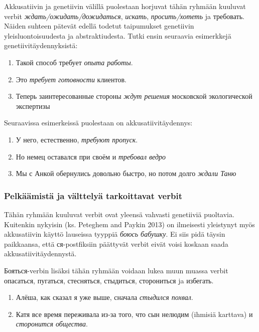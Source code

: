 \documentclass[]{scrartcl}
\providecommand{\tightlist}{%
  \setlength{\itemsep}{0pt}\setlength{\parskip}{0pt}}
\begin{document}
Akkusatiivin ja genetiivin välillä puolestaan horjuvat tähän ryhmään
kuuluvat verbit \emph{ждать/ожидать/дожидаться}, \emph{искать},
\emph{просить/хотеть} ja требовать. Näiden suhteen pätevät edellä
todetut taipumukset genetiivin yleisluontoisuudesta ja abstraktiudesta.
Tutki ensin seuraavia esimerkkejä genetiivitäydennyksistä:

\begin{enumerate}
\def\labelenumi{(\arabic{enumi})}
\setcounter{enumi}{49}
\tightlist
\item
  Такой способ требует \emph{опыта работы}.
\item
  Это \emph{требует готовности} клиентов.
\item
  Теперь заинтересованные стороны \emph{ждут решения} московской
  экологической экспертизы
\end{enumerate}

Seuraavissa esimerkeissä puolestaan on akkusatiivitäydennys:

\begin{enumerate}
\def\labelenumi{(\arabic{enumi})}
\setcounter{enumi}{52}
\tightlist
\item
  У него, естественно, \emph{требуют пропуск}.
\item
  Но немец оставался при своём и \emph{требовал ведро}
\item
  Мы с Анкой обернулись довольно быстро, но потом долго \emph{ждали
  Таню}
\end{enumerate}

\subsubsection{Pelkäämistä ja välttelyä tarkoittavat
verbit}\label{pelkuxe4uxe4mistuxe4-ja-vuxe4lttelyuxe4-tarkoittavat-verbit}

Tähän ryhmään kuuluvat verbit ovat yleensä vahvasti genetiiviä
puoltavia. Kuitenkin nykyisin (ks. Peteghem and Paykin 2013) on
ilmeisesti yleistynyt myös akkusatiivin käyttö lauseissa tyyppiä
\emph{боюсь бабушку}. Ei siis pidä täysin paikkaansa, että
ся-postfiksiin päättyvät verbit eivät voisi koskaan saada
akkusatiivitäydennystä.

Бояться-verbin lisäksi tähän ryhmään voidaan lukea muun muassa verbit
опасаться, пугаться, стесняться, стыдиться, сторониться ja избегать.

\begin{enumerate}
\def\labelenumi{(\arabic{enumi})}
\setcounter{enumi}{55}
\tightlist
\item
  Алёша, как сказал я уже выше, сначала \emph{стыдился похвал}.
\item
  Катя все время переживала из-за того, что сын нелюдим (ihmisiä
  karttava) и \emph{сторонится общества}.
\end{enumerate}
\end{document}
